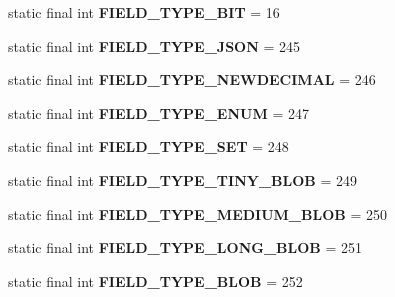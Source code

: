 \begin{DoxyCompactItemize}
static final int {\bfseries F\+I\+E\+L\+D\+\_\+\+T\+Y\+P\+E\+\_\+\+B\+IT} = 16
\item 
\mbox{\label{enumcom_1_1mysql_1_1cj_1_1_mysql_type_aadc8487d4355e8d56b00a203df999374}} 
static final int {\bfseries F\+I\+E\+L\+D\+\_\+\+T\+Y\+P\+E\+\_\+\+J\+S\+ON} = 245
\item 
\mbox{\label{enumcom_1_1mysql_1_1cj_1_1_mysql_type_a082e76a77ae3f5fc6648a1480f86cb8f}} 
static final int {\bfseries F\+I\+E\+L\+D\+\_\+\+T\+Y\+P\+E\+\_\+\+N\+E\+W\+D\+E\+C\+I\+M\+AL} = 246
\item 
\mbox{\label{enumcom_1_1mysql_1_1cj_1_1_mysql_type_af147d78e6d19879a5c94d5130edd5300}} 
static final int {\bfseries F\+I\+E\+L\+D\+\_\+\+T\+Y\+P\+E\+\_\+\+E\+N\+UM} = 247
\item 
\mbox{\label{enumcom_1_1mysql_1_1cj_1_1_mysql_type_ab41368e4040262ca9b5d2d487278a382}} 
static final int {\bfseries F\+I\+E\+L\+D\+\_\+\+T\+Y\+P\+E\+\_\+\+S\+ET} = 248
\item 
\mbox{\label{enumcom_1_1mysql_1_1cj_1_1_mysql_type_a4254572aa52a4817cb0f57efdc7b6266}} 
static final int {\bfseries F\+I\+E\+L\+D\+\_\+\+T\+Y\+P\+E\+\_\+\+T\+I\+N\+Y\+\_\+\+B\+L\+OB} = 249
\item 
\mbox{\label{enumcom_1_1mysql_1_1cj_1_1_mysql_type_a3166d3060176f3115899203f07161dda}} 
static final int {\bfseries F\+I\+E\+L\+D\+\_\+\+T\+Y\+P\+E\+\_\+\+M\+E\+D\+I\+U\+M\+\_\+\+B\+L\+OB} = 250
\item 
\mbox{\label{enumcom_1_1mysql_1_1cj_1_1_mysql_type_ab45f39010f8b0c1a1a63371d7db696b3}} 
static final int {\bfseries F\+I\+E\+L\+D\+\_\+\+T\+Y\+P\+E\+\_\+\+L\+O\+N\+G\+\_\+\+B\+L\+OB} = 251
\item 
\mbox{\label{enumcom_1_1mysql_1_1cj_1_1_mysql_type_acfe683ff8b22b0304d64aca065a34445}} 
static final int {\bfseries F\+I\+E\+L\+D\+\_\+\+T\+Y\+P\+E\+\_\+\+B\+L\+OB} = 252
\item 

\end{DoxyCompactItemize}
